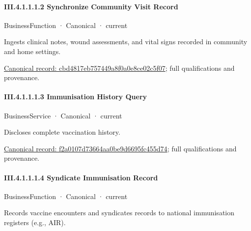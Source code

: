 \paragraph*{III.4.1.1.1.2 Synchronize Community Visit Record}
\label{navigation:III.4.1.1.1.2}

\label{element:cbd4817eb757449a8f0a0e8ce02c5f07}
{\small BusinessFunction · Canonical · current}\par

Ingests clinical notes, wound assessments, and vital signs recorded in community and home settings.


{\footnotesize \href{../../../../../../../../continuum/business/business-function/cbd4817eb757449a8f0a0e8ce02c5f07.md}{Canonical record: cbd4817eb757449a8f0a0e8ce02c5f07}; full qualifications and provenance.}\par
\paragraph*{III.4.1.1.1.3 Immunisation History Query}
\label{navigation:III.4.1.1.1.3}

\label{element:f2a0107d73664aa0be9d6695fc455d74}
{\small BusinessService · Canonical · current}\par

Discloses complete vaccination history.


{\footnotesize \href{../../../../../../../../continuum/business/business-service/f2a0107d73664aa0be9d6695fc455d74.md}{Canonical record: f2a0107d73664aa0be9d6695fc455d74}; full qualifications and provenance.}\par
\paragraph*{III.4.1.1.1.4 Syndicate Immunisation Record}
\label{navigation:III.4.1.1.1.4}

\label{element:5a2c53df2e92444ab9b5018b224d98f9}
{\small BusinessFunction · Canonical · current}\par

Records vaccine encounters and syndicates records to national immunisation registers (e.g., AIR).


